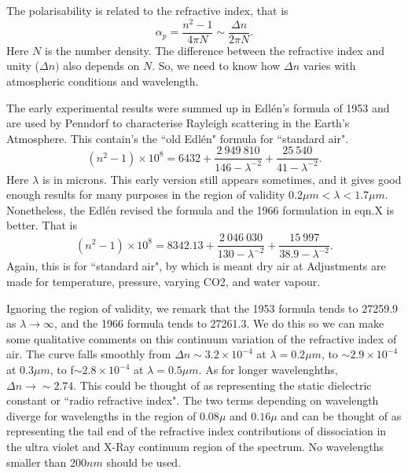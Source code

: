 \documentclass[12pt]{article}
\begin{document}
The polarisability is related to the
refractive index, that is
\begin{equation}
\alpha_p=\frac{n^2-1}{ 4 \pi N} \sim \frac{\Delta n}{2 \pi N}.
\end{equation}
Here $N$ is the number density. The difference between the refractive index and unity ($\Delta n)$ also
depends on $N$. So, we need to know how $\Delta n$ varies with atmospheric conditions and wavelength.

The early experimental results were summed up in Edl\'{e}n's formula of 1953
\cite{Edlen1:Mybib} and are used by Penndorf \cite{PenndorfAir:Mybib} to characterise Rayleigh scattering in the
Earth's Atmosphere. This contain's the ``old Edl\'{e}n" formula for ``standard air".
\begin{equation}
(n^2-1)\times 10^8=6432+\frac{2\>949\>810}{146-\lambda^{-2}}+\frac{25\>540}{41-\lambda^{-2}}.
\end{equation}
Here $\lambda$ is in microns.
This early version still appears sometimes, and it gives good enough results for many purposes
 in the region of validity $0.2 \mu m < \lambda < 1.7 \mu m$. Nonetheless, the Edl\'{e}n revised the
formula \cite{Edlen2:Mybib} and the 1966 formulation in eqn.X is better. That is
\begin{equation}
(n^2-1)\times 10^8=8342.13+\frac{2\>046\>030}{130-\lambda^{-2}}+\frac{15\>997}{38.9-\lambda^{-2}}.
\end{equation}
Again, this is for ``standard air", by which is meant dry air at
Adjustments are made for temperature, pressure, varying CO2, and water vapour.

Ignoring the region of validity, we remark that the  1953 formula tends to 27259.9
 as $\lambda \rightarrow \infty$,  and the 1966 formula tends to 27261.3. We do this so we can make some qualitative comments on
this continuum variation of the refractive index of air. The
curve falls smoothly from $\Delta n \sim 3.2 \times 10^{-4}$
 at $\lambda=0.2 \mu m$, to $\sim 2.9 \times 10^{-4}$ at 0.3$\mu m$, to f$\sim 2.8 \times 10^{-4}$ at $\lambda=0.5 \mu m$. As for longer wavelenghths, $\Delta n \rightarrow \sim 2.74$. This could be thought of as representing the static dielectric constant or ``radio refractive index".
The two terms depending on wavelength diverge for wavelengths in the region of $0.08 \mu$ and $0.16 \mu$ and can be thought of as representing the tail end of the refractive index contributions of dissociation in the ultra violet and X-Ray continuum region of the spectrum. No wavelengths smaller than 200$nm$ should be used.





\newpage


\end{document}
